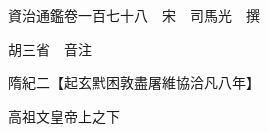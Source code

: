 










 


 
 


 

  
  
  
  
  





  
  
  
  
  
 
  

  

  
  
  



  

 
 

  
   




  

  
  


  　　資治通鑑卷一百七十八　宋　司馬光　撰

　　胡三省　音注

　　隋紀二【起玄黓困敦盡屠維協洽凡八年】

　　高祖文皇帝上之下

